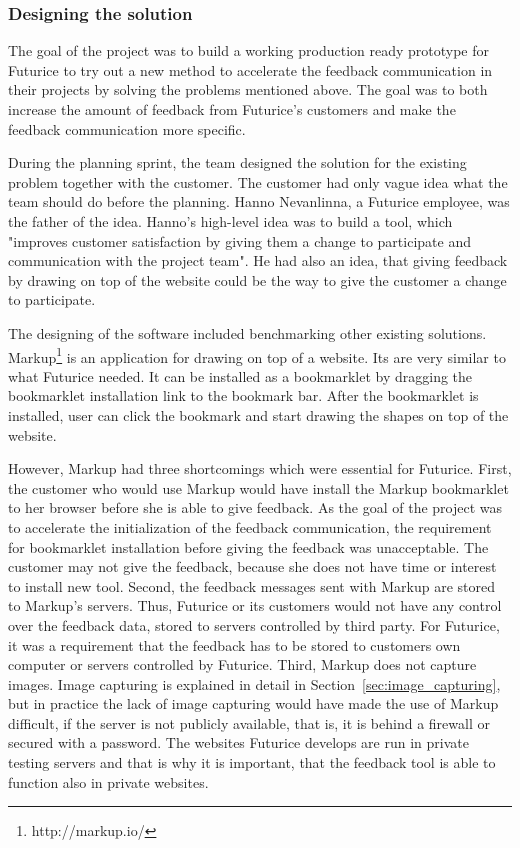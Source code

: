 \documentclass[english,12pt,a4paper,pdftex]{article}
\begin{document}
\subsubsection{Designing the solution}

The goal of the project was to build a working production ready prototype for Futurice to try out a new method to accelerate the feedback communication in their projects by solving the problems mentioned above. The goal was to both increase the amount of feedback from Futurice's customers and make the feedback communication more specific.

During the planning sprint, the team designed the solution for the existing problem together with the customer. The customer had only vague idea what the team should do before the planning. Hanno Nevanlinna, a Futurice employee, was the father of the idea. Hanno's high-level idea was to build a tool, which "improves customer satisfaction by giving them a change to participate and communication with the project team". He had also an idea, that giving feedback by drawing on top of the website could be the way to give the customer a change to participate.

The designing of the software included benchmarking other existing solutions. Markup\footnote{http://markup.io/} is an application for drawing on top of a website. Its are very similar to what Futurice needed. It can be installed as a bookmarklet by dragging the bookmarklet installation link to the bookmark bar. After the bookmarklet is installed, user can click the bookmark and start drawing the shapes on top of the website. 

However, Markup had three shortcomings which were essential for Futurice. First, the customer who would use Markup would have install the Markup bookmarklet to her browser before she is able to give feedback. As the goal of the project was to accelerate the initialization of the feedback communication, the requirement for bookmarklet installation before giving the feedback was unacceptable. The customer may not give the feedback, because she does not have time or interest to install new tool. Second, the feedback messages sent with Markup are stored to Markup's servers. Thus, Futurice or its customers would not have any control over the feedback data, stored to servers controlled by third party. For Futurice, it was a requirement that the feedback has to be stored to customers own computer or servers controlled by Futurice. Third, Markup does not capture images. Image capturing is explained in detail in Section~\ref{sec:image_capturing}, but in practice the lack of image capturing would have made the use of Markup difficult, if the server is not publicly available, that is, it is behind a firewall or secured with a password. The websites Futurice develops are run in private testing servers and that is why it is important, that the feedback tool is able to function also in private websites.
\end{document}
